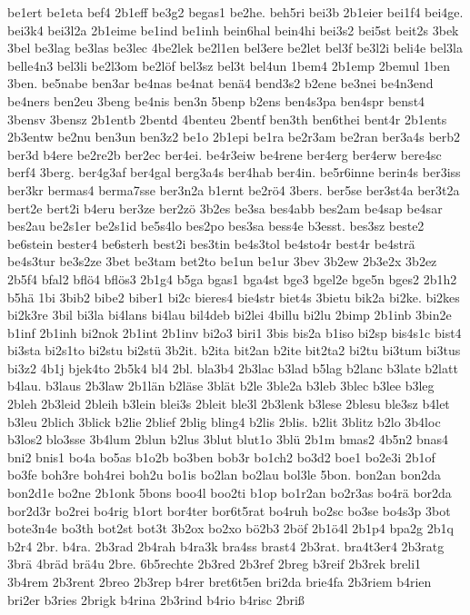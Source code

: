 {be1ert
be1eta
bef4
2b1eff
be3g2
begas1
be2he.
beh5ri
bei3b
2b1eier
bei1f4
bei4ge.
bei3k4
bei3l2a
2b1eime
be1ind
be1inh
bein6hal
bein4hi
bei3s2
bei5st
beit2s
3bek
3bel
be3lag
be3las
be3lec
4be2lek
be2l1en
bel3ere
be2let
bel3f
be3l2i
beli4e
bel3la
belle4n3
bel3li
be2l3om
be2löf
bel3sz
bel3t
bel4un
1bem4
2b1emp
2bemul
1ben
3ben.
be5nabe
ben3ar
be4nas
be4nat
benä4
bend3s2
b2ene
be3nei
be4n3end
be4ners
ben2eu
3beng
be4nis
ben3n
5benp
b2ens
ben4s3pa
ben4spr
benst4
3bensv
3bensz
2b1entb
2bentd
4benteu
2bentf
ben3th
ben6thei
bent4r
2b1ents
2b3entw
be2nu
ben3un
ben3z2
be1o
2b1epi
be1ra
be2r3am
be2ran
ber3a4s
berb2
ber3d
b4ere
be2re2b
ber2ec
ber4ei.
be4r3eiw
be4rene
ber4erg
ber4erw
bere4sc
berf4
3berg.
ber4g3af
ber4gal
berg3a4s
ber4hab
ber4in.
be5r6inne
berin4s
ber3iss
ber3kr
bermas4
berma7sse
ber3n2a
b1ernt
be2rö4
3bers.
ber5se
ber3st4a
ber3t2a
bert2e
bert2i
b4eru
ber3ze
ber2zö
3b2es
be3sa
bes4abb
bes2am
be4sap
be4sar
bes2au
be2s1er
be2s1id
be5s4lo
bes2po
bes3sa
bess4e
b3esst.
bes3sz
beste2
be6stein
bester4
be6sterh
best2i
bes3tin
be4s3tol
be4sto4r
best4r
be4strä
be4s3tur
be3s2ze
3bet
be3tam
bet2to
be1un
be1ur
3bev
3b2ew
2b3e2x
3b2ez
2b5f4
bfal2
bflö4
bflös3
2b1g4
b5ga
bgas1
bga4st
bge3
bgel2e
bge5n
bges2
2b1h2
b5hä
1bi
3bib2
bibe2
biber1
bi2c
bieres4
bie4str
biet4s
3bietu
bik2a
bi2ke.
bi2kes
bi2k3re
3bil
bi3la
bi4lans
bi4lau
bil4deb
bi2lei
4billu
bi2lu
2bimp
2b1inb
3bin2e
b1inf
2b1inh
bi2nok
2b1int
2b1inv
bi2o3
biri1
3bis
bis2a
b1iso
bi2sp
bis4s1c
bist4
bi3sta
bi2s1to
bi2stu
bi2stü
3b2it.
b2ita
bit2an
b2ite
bit2ta2
bi2tu
bi3tum
bi3tus
bi3z2
4b1j
bjek4to
2b5k4
bl4
2bl.
bla3b4
2b3lac
b3lad
b5lag
b2lanc
b3late
b2latt
b4lau.
b3laus
2b3law
2b1län
b2läse
3blät
b2le
3ble2a
b3leb
3blec
b3lee
b3leg
2bleh
2b3leid
2bleih
b3lein
blei3s
2bleit
ble3l
2b3lenk
b3lese
2blesu
ble3sz
b4let
b3leu
2blich
3blick
b2lie
2blief
2blig
bling4
b2lis
2blis.
b2lit
3blitz
b2lo
3b4loc
b3los2
blo3sse
3b4lum
2blun
b2lus
3blut
blut1o
3blü
2b1m
bmas2
4b5n2
bnas4
bni2
bnis1
bo4a
bo5as
b1o2b
bo3ben
bob3r
bo1ch2
bo3d2
boe1
bo2e3i
2b1of
bo3fe
boh3re
boh4rei
boh2u
bo1is
bo2lan
bo2lau
bol3le
5bon.
bon2an
bon2da
bon2d1e
bo2ne
2b1onk
5bons
boo4l
boo2ti
b1op
bo1r2an
bo2r3as
bo4rä
bor2da
bor2d3r
bo2rei
bo4rig
b1ort
bor4ter
bor6t5rat
bo4ruh
bo2sc
bo3se
bo4s3p
3bot
bote3n4e
bo3th
bot2st
bot3t
3b2ox
bo2xo
bö2b3
2böf
2b1ö4l
2b1p4
bpa2g
2b1q
b2r4
2br.
b4ra.
2b3rad
2b4rah
b4ra3k
bra4ss
brast4
2b3rat.
bra4t3er4
2b3ratg
3brä
4bräd
brä4u
2bre.
6b5rechte
2b3red
2b3ref
2breg
b3reif
2b3rek
breli1
3b4rem
2b3rent
2breo
2b3rep
b4rer
bret6t5en
bri2da
brie4fa
2b3riem
b4rien
bri2er
b3ries
2brigk
b4rina
2b3rind
b4rio
b4risc
2briß
}

